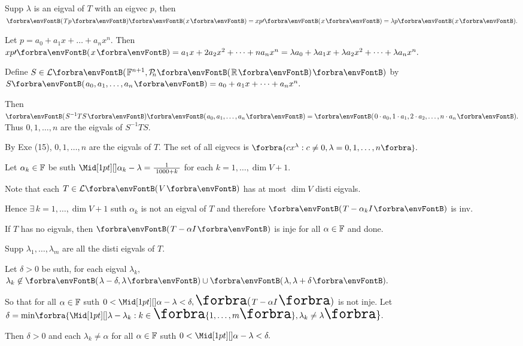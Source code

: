 \par\quad
Supp $\lambda$ is an eigval of $T$ with an eigvec $p$, then $\Par{Tp}\Par{x}=xp\apostrophe\Par{x}=\lambda p\Par{x}.$\par\quad
Let $p=a_0+a_1 x+\dots+a_n x^n.$ Then $xp\apostrophe\Par{x}=a_1 x+2a_2 x^2+\dots+n a_n x^n=\lambda a_0+\lambda a_1 x+\lambda a_2 x^2+\dots+\lambda a_n x^n.$\par\quad
Define $S\in\Lm{\Fbb^{n+1},\PoR{n}}$ by $S\Par{a_0,a_1,\dots,a_n}=a_0+a_1x+\dots+a_nx^n.$\par\quad
Then $\Par{S^{-1}TS}\Par{a_0,a_1,\dots,a_n}=\Par{0\cdot a_0,1\cdot a_1,2\cdot a_2,\dots,n\cdot a_n}.$ Thus $0,1,\dots,n$ are the eigvals of $S^{-1}TS.$\par\quad
By Exe (15), $0,1,\dots,n$ are the eigvals of $T$. The set of all eigvecs is $\Bra{cx^\lambda:c\neq 0,\lambda=0,1,\dots,n}.$\PfEnd
\SepLine

\par\quad
Let $\alpha_k\in{\mathbb{F}}$ be suth $\aMid{\alpha_k-\lambda}=\frac{1}{\;1000+k\;}$ for each $k=1,\dots,\dim V+1.$\par\vspace{2pt}\quad
Note that each $T\in\Lm{V}$ has at most $\dim V$ disti eigvals.\par\quad
Hence $\exists\,k=1,\dots,\dim V+1$ suth $\alpha_k$ is not an eigval of $T$ and therefore $\Par{T-\alpha_k I}$ is inv.\PfEnd
\SepLine[0pt][\Blind{\BulletPointX} ]

\par\quad
If $T$ has no eigvals, then $\Par{T-\alpha I}$ is inje for all $\alpha\in{\mathbb{F}}$ and done.\par\quad
Supp $\lambda_1,\dots,\lambda_m$ are all the disti eigvals of $T.$\par\quad
Let $\delta>0$ be suth, for each eigval $\lambda_k,$ $\lambda_k\not\in\Par{\lambda-\delta,\lambda}\cup \Par{\lambda,\lambda+\delta}.$\par\quad
So that for all $\alpha\in{\mathbb{F}}$ suth $0<\aMid{\alpha-\lambda}<\delta,\Par{T-\alpha I}$ is not inje.\PfEnd\vspace{4pt}\quad
\Or Let $\delta=\min\!\Bra{\aMid{\lambda-\lambda_k}:k\in\envFontSmall\Bra{1,\dots,m}\envFontDefault,\lambda_k\neq\lambda}.$\par\quad
Then $\delta>0$ and each $\lambda_k\neq\alpha$  for all $\alpha\in{\mathbb{F}}$ suth $0<\aMid{\alpha-\lambda}<\delta.$\PfEnd
\SepLine

